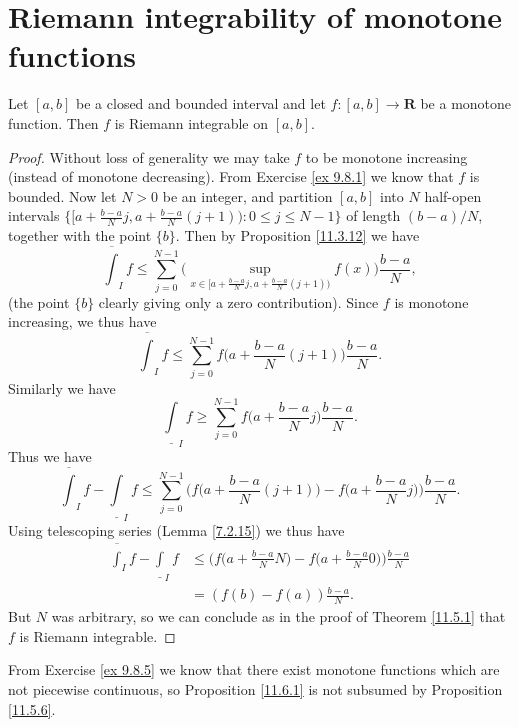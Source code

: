 \section{Riemann integrability of monotone functions}\label{sec 11.6}

\begin{proposition}\label{11.6.1}
    Let \([a, b]\) be a closed and bounded interval and let \(f : [a, b] \to \mathbf{R}\) be a monotone function.
    Then \(f\) is Riemann integrable on \([a, b]\).
\end{proposition}

\begin{proof}
    Without loss of generality we may take \(f\) to be monotone increasing (instead of monotone decreasing).
    From Exercise \ref{ex 9.8.1} we know that \(f\) is bounded.
    Now let \(N > 0\) be an integer, and partition \([a, b]\) into \(N\) half-open intervals \(\{[a + \frac{b - a}{N} j, a + \frac{b - a}{N} (j + 1)) : 0 \leq j \leq N - 1\}\) of length \((b - a) / N\), together with the point \(\{b\}\).
    Then by Proposition \ref{11.3.12} we have
    \[
        \overline{\int}_I f \leq \sum_{j = 0}^{N - 1} \Bigg(\sup_{x \in [a + \frac{b - a}{N} j, a + \frac{b - a}{N} (j + 1))} f(x)\Bigg) \frac{b - a}{N},
    \]
    (the point \(\{b\}\) clearly giving only a zero contribution).
    Since \(f\) is monotone increasing, we thus have
    \[
        \overline{\int}_I f \leq \sum_{j = 0}^{N - 1} f\bigg(a + \frac{b - a}{N} (j + 1)\bigg) \frac{b - a}{N}.
    \]
    Similarly we have
    \[
        \underline{\int}_I f \geq \sum_{j = 0}^{N - 1} f\bigg(a + \frac{b - a}{N} j\bigg) \frac{b - a}{N}.
    \]
    Thus we have
    \[
        \overline{\int}_I f - \underline{\int}_I f \leq \sum_{j = 0}^{N - 1} \Bigg(f\bigg(a + \frac{b - a}{N} (j + 1)\bigg) - f\bigg(a + \frac{b - a}{N} j\bigg)\Bigg) \frac{b - a}{N}.
    \]
    Using telescoping series (Lemma \ref{7.2.15}) we thus have
    \begin{align*}
        \overline{\int}_I f - \underline{\int}_I f & \leq \Bigg(f\bigg(a + \frac{b - a}{N} N\bigg) - f\bigg(a + \frac{b - a}{N} 0\bigg)\Bigg) \frac{b - a}{N} \\
                                                   & = (f(b) - f(a)) \frac{b - a}{N}.
    \end{align*}
    But \(N\) was arbitrary, so we can conclude as in the proof of Theorem \ref{11.5.1} that \(f\) is Riemann integrable.
\end{proof}

\begin{remark}\label{11.6.2}
    From Exercise \ref{ex 9.8.5} we know that there exist monotone functions which are not piecewise continuous, so Proposition \ref{11.6.1} is not subsumed by Proposition \ref{11.5.6}.
\end{remark}

